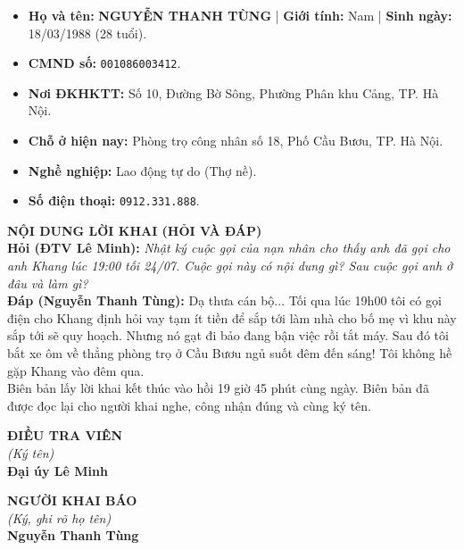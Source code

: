 \documentclass[12pt,a4paper]{article}
\begin{document}
\begin{itemize}[leftmargin=*, itemsep=2pt, topsep=2pt, parsep=0pt]
  \item \textbf{Họ và tên:} \textbf{NGUYỄN THANH TÙNG} | \textbf{Giới tính:} Nam | \textbf{Sinh ngày:} 18/03/1988 (28 tuổi).
  \item \textbf{CMND số:} \texttt{001086003412}.
  \item \textbf{Nơi ĐKHKTT:} Số 10, Đường Bờ Sông, Phường Phân khu Cảng, TP. Hà Nội.
  \item \textbf{Chỗ ở hiện nay:} Phòng trọ công nhân số 18, Phố Cầu Bươu, TP. Hà Nội.
  \item \textbf{Nghề nghiệp:} Lao động tự do (Thợ nề).
  \item \textbf{Số điện thoại:} \texttt{0912.331.888}.


\end{itemize}

\vspace{0.3cm}\noindent\textbf{\large NỘI DUNG LỜI KHAI (HỎI VÀ ĐÁP)}\\[0.15cm]


\noindent\textbf{Hỏi (ĐTV Lê Minh):} \textit{Nhật ký cuộc gọi của nạn nhân cho thấy anh đã gọi cho anh Khang lúc 19:00 tối 24/07. Cuộc gọi này có nội dung gì? Sau cuộc gọi anh ở đâu và làm gì?}\\[0.15cm]
\noindent\textbf{Đáp (Nguyễn Thanh Tùng):} Dạ thưa cán bộ... Tối qua lúc 19h00 tôi có gọi điện cho Khang định hỏi vay tạm ít tiền để sắp tới làm nhà cho bố mẹ vì khu này sắp tới sẽ quy hoạch. Nhưng nó gạt đi bảo đang bận việc rồi tắt máy. Sau đó tôi bắt xe ôm về thẳng phòng trọ ở Cầu Bươu ngủ suốt đêm đến sáng! Tôi không hề gặp Khang vào đêm qua.\\[0.35cm]

Biên bản lấy lời khai kết thúc vào hồi 19 giờ 45 phút cùng ngày. Biên bản đã được đọc lại cho người khai nghe, công nhận đúng và cùng ký tên.

\vspace{0.8cm}
\noindent
\begin{minipage}[t]{0.48\textwidth}
    \begin{center}
        \textbf{ĐIỀU TRA VIÊN}\\[0.1cm]
        \textit{(Ký tên)}\\[1.6cm]
        \textbf{Đại úy Lê Minh}
    \end{center}
\end{minipage}
\hfill
\begin{minipage}[t]{0.48\textwidth}
    \begin{center}
        \textbf{NGƯỜI KHAI BÁO}\\[0.1cm]
        \textit{(Ký, ghi rõ họ tên)}\\[1.6cm]
        \textbf{Nguyễn Thanh Tùng}
    \end{center}
\end{minipage}
\end{document}
